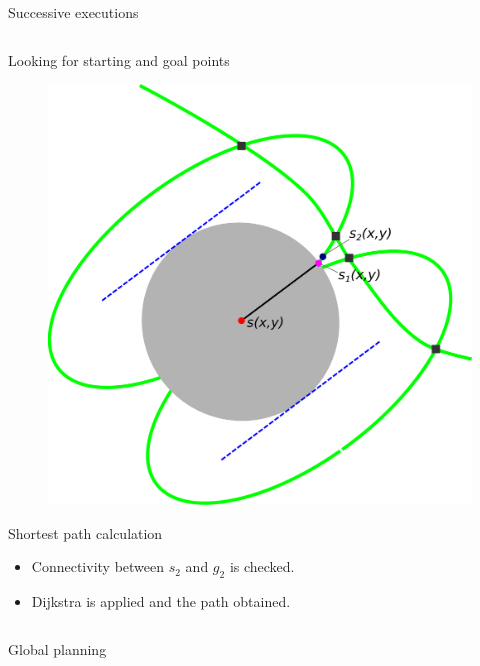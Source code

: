 \begin{frame}{Successive executions}
\begin{columns}
\begin{overlayarea}{\textwidth}{\textheight}
{{\begin{block}{Looking for starting and goal points}
\begin{figure}
	      \includegraphics[height=0.4\textheight]{figure6}
	    \end{figure}
	  \end{block}
	}
	 {
	  \begin{block}{Shortest path calculation}
	    \begin{itemize}
	      \item Connectivity between $s_2$ and $g_2$ is checked.
	      \item Dijkstra is applied and the path obtained.
	    \end{itemize}
	  \end{block}
	}
      }
      
    \end{overlayarea}
  \end{columns}

\end{frame}

\begin{frame}{Global planning}
 \begin{figure}
 \end{figure}
\end{frame}
